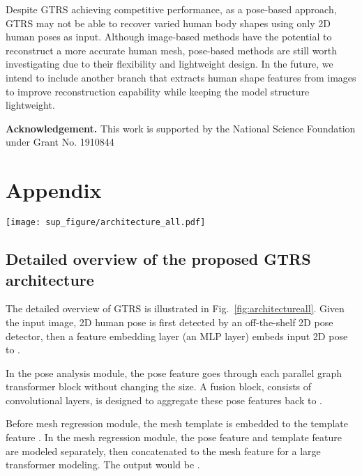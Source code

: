 \documentclass[sigconf]{acmart}
\begin{document}
Despite GTRS achieving competitive performance, as a pose-based approach, GTRS may not be able to recover varied human body shapes using only 2D human poses as input. Although image-based methods have the potential to reconstruct a more accurate human mesh, pose-based methods are still worth investigating due to their flexibility and lightweight design. In the future, we intend to include another branch that extracts human shape features from images to improve reconstruction capability while keeping the model structure lightweight.

\noindent \textbf{Acknowledgement.} This work is supported by the National Science Foundation under Grant No. 1910844

\newpage
\appendix
\section{Appendix}


\begin{figure*}[!htbp]
\vspace{-10pt}
  \centering
  \texttt{[image: sup\_figure/architecture\_all.pdf]}
  \vspace{-15pt}
  \caption{Overview of the proposed GTRS architecture. The mesh template figure is from \cite{lin2021metro}. }
  \label{fig:architectureall}
  \vspace{-5pt}
\end{figure*}

\subsection{Detailed overview of the proposed GTRS architecture}
The detailed overview of GTRS is illustrated in Fig.~\ref{fig:architectureall}. Given the input image, 2D human pose  is first detected by an off-the-shelf 2D pose detector, then a feature embedding layer (an MLP layer) embeds input 2D pose to  .

In the pose analysis module, the pose feature  goes through each parallel graph transformer block without changing the size. A fusion block, consists of convolutional layers, is designed to aggregate these pose features back to  . 

Before mesh regression module, the mesh template  is embedded to the template feature  . In the mesh regression module, the pose feature  and template feature   are modeled separately, then concatenated to the mesh feature  for a large transformer modeling. The output would be .  
\end{document}
